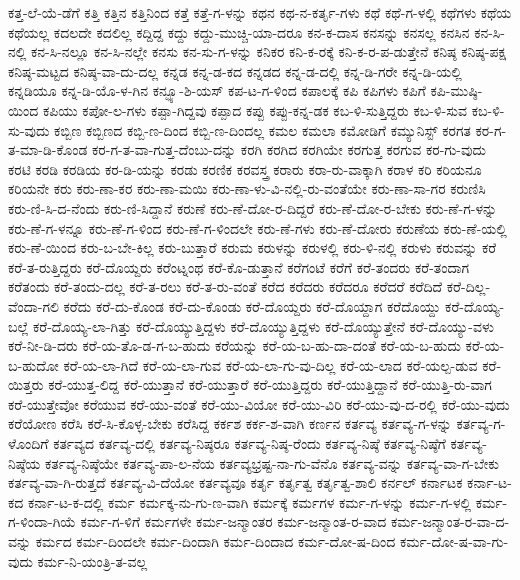 {ಕತ್ತ-ಲೆ-ಯೆ-ಡೆಗೆ
ಕತ್ತಿ
ಕತ್ತಿನ
ಕತ್ತಿನಿಂದ
ಕತ್ತೆ
ಕತ್ತೆ-ಗ-ಳನ್ನು
ಕಥನ
ಕಥ-ನ-ಕರ್ತೃ-ಗಳು
ಕಥೆ
ಕಥೆ-ಗ-ಳಲ್ಲಿ
ಕಥೆಗಳು
ಕಥೆಯ
ಕಥೆಯಲ್ಲ
ಕದಲದೇ
ಕದಲಿಲ್ಲ
ಕದ್ದಿದ್ದ
ಕದ್ದು
ಕದ್ದು-ಮುಚ್ಚಿ-ಯಾ-ದರೂ
ಕನ-ಕ-ದಾಸ
ಕನಸನ್ನು
ಕನಸಲ್ಲ
ಕನಸಿನ
ಕನ-ಸಿ-ನಲ್ಲಿ
ಕನ-ಸಿ-ನಲ್ಲೂ
ಕನ-ಸಿ-ನಲ್ಲೇ
ಕನಸು
ಕನ-ಸು-ಗ-ಳನ್ನು
ಕನಿಕರ
ಕನಿ-ಕ-ರಕ್ಕೆ
ಕನಿ-ಕ-ರ-ಪ-ಡುತ್ತೇನೆ
ಕನಿಷ್ಠ
ಕನಿಷ್ಠ-ಪಕ್ಷ
ಕನಿಷ್ಠ-ಮಟ್ಟದ
ಕನಿಷ್ಠ-ವಾ-ದು-ದಲ್ಲ
ಕನ್ನಡ
ಕನ್ನ-ಡ-ಕದ
ಕನ್ನಡದ
ಕನ್ನ-ಡ-ದಲ್ಲಿ
ಕನ್ನ-ಡಿ-ಗರೇ
ಕನ್ನ-ಡಿ-ಯಲ್ಲಿ
ಕನ್ನಡಿಯೂ
ಕನ್ನ-ಡಿ-ಯೊ-ಳ-ಗಿನ
ಕನ್ಫ್ಯೂ-ಶಿ-ಯಸ್
ಕಪ-ಟ-ಗ-ಳಿಂದ
ಕಪಾಲಕ್ಕೆ
ಕಪಿ
ಕಪಿಗಳು
ಕಪಿಗೆ
ಕಪಿ-ಮುಷ್ಠಿ-ಯಿಂದ
ಕಪಿಯು
ಕಪೋ-ಲ-ಗಳು
ಕಪ್ಪಾ-ಗಿದ್ದವು
ಕಪ್ಪಾದ
ಕಪ್ಪು
ಕಪ್ಪು-ಕನ್ನ-ಡಕ
ಕಬ-ಳಿ-ಸುತ್ತಿದ್ದರು
ಕಬ-ಳಿ-ಸುವ
ಕಬ-ಳಿ-ಸು-ವುದು
ಕಬ್ಬಿಣ
ಕಬ್ಬಿಣದ
ಕಬ್ಬಿ-ಣ-ದಿಂದ
ಕಬ್ಬಿ-ಣ-ದಿಂದಲ್ಲ
ಕಮಲ
ಕಮಲಾ
ಕಮೋಡಿಗೆ
ಕಮ್ಯುನಿಸ್ಟ್
ಕರಗತ
ಕರ-ಗ-ತ-ಮಾ-ಡಿ-ಕೊಂಡ
ಕರ-ಗ-ತ-ವಾ-ಗುತ್ತ-ದೆಂಬು-ದನ್ನು
ಕರಗಿ
ಕರಗಿದ
ಕರಗಿಯೇ
ಕರಗುತ್ತ
ಕರಗುವ
ಕರ-ಗು-ವುದು
ಕರಟಿ
ಕರಡಿ
ಕರಡಿಯ
ಕರ-ಡಿ-ಯನ್ನು
ಕರಡು
ಕರಣಿಕ
ಕರವಸ್ತ್ರ
ಕರಾರು
ಕರಾ-ರು-ವಾಕ್ಕಾಗಿ
ಕರಾಳ
ಕರಿ
ಕರಿಯನೂ
ಕರಿಯನೇ
ಕರು
ಕರು-ಣಾ-ಕರ
ಕರು-ಣಾ-ಮಯಿ
ಕರು-ಣಾ-ಳು-ವಿ-ನಲ್ಲಿ-ರು-ವಂತೆಯೇ
ಕರು-ಣಾ-ಸಾ-ಗರ
ಕರುಣಿಸಿ
ಕರು-ಣಿ-ಸಿ-ದ-ನೆಂದು
ಕರು-ಣಿ-ಸಿದ್ದಾನೆ
ಕರುಣೆ
ಕರು-ಣೆ-ದೋ-ರ-ದಿದ್ದರೆ
ಕರು-ಣೆ-ದೋ-ರ-ಬೇಕು
ಕರು-ಣೆ-ಗ-ಳನ್ನು
ಕರು-ಣೆ-ಗ-ಳನ್ನೂ
ಕರು-ಣೆ-ಗ-ಳಿಂದ
ಕರು-ಣೆ-ಗ-ಳಿಂದಲೇ
ಕರು-ಣೆ-ಗಳು
ಕರು-ಣೆ-ದೋರು
ಕರುಣೆಯ
ಕರು-ಣೆ-ಯಲ್ಲಿ
ಕರು-ಣೆ-ಯಿಂದ
ಕರು-ಬ-ಬೇ-ಕಿಲ್ಲ
ಕರು-ಬುತ್ತಾರೆ
ಕರುಮ
ಕರುಳನ್ನು
ಕರುಳಲ್ಲಿ
ಕರು-ಳಿ-ನಲ್ಲಿ
ಕರುಳು
ಕರುವನ್ನು
ಕರೆ
ಕರೆ-ತ-ರುತ್ತಿದ್ದರು
ಕರೆ-ದೊಯ್ದರು
ಕರೆಂಟ್ನಂಥ
ಕರೆ-ಕೊ-ಡುತ್ತಾನೆ
ಕರೆಗಂಟೆ
ಕರೆಗೆ
ಕರೆ-ತಂದರು
ಕರೆ-ತಂದಾಗ
ಕರೆತಂದು
ಕರೆ-ತಂದು-ದಲ್ಲ
ಕರೆ-ತ-ರಲು
ಕರೆ-ತ-ರು-ವಂತೆ
ಕರೆದ
ಕರೆದರು
ಕರೆದರೂ
ಕರೆದರೆ
ಕರೆದಿದೆ
ಕರೆ-ದಿಲ್ಲ-ವೆಂದಾ-ಗಲಿ
ಕರೆದು
ಕರೆ-ದು-ಕೊಂಡ
ಕರೆ-ದು-ಕೊಂಡು
ಕರೆ-ದೊಯ್ದರು
ಕರೆ-ದೊಯ್ದಾಗ
ಕರೆದೊಯ್ದು
ಕರೆ-ದೊಯ್ಯ-ಬಲ್ಲೆ
ಕರೆ-ದೊಯ್ಯ-ಲಾ-ಗಿತ್ತು
ಕರೆ-ದೊಯ್ಯುತ್ತಿದ್ದಳು
ಕರೆ-ದೊಯ್ಯುತ್ತಿದ್ದಳು
ಕರೆ-ದೊಯ್ಯುತ್ತೇನೆ
ಕರೆ-ದೊಯ್ಯು-ವಳು
ಕರೆ-ನೀ-ಡಿ-ದರು
ಕರೆ-ಯ-ತೊ-ಡ-ಗ-ಬ-ಹುದು
ಕರೆಯನ್ನು
ಕರೆ-ಯ-ಬ-ಹು-ದಾ-ದಂತೆ
ಕರೆ-ಯ-ಬ-ಹುದು
ಕರೆ-ಯ-ಬ-ಹುದೋ
ಕರೆ-ಯ-ಲಾ-ಗಿದೆ
ಕರೆ-ಯ-ಲಾ-ಗುವ
ಕರೆ-ಯ-ಲಾ-ಗು-ವು-ದಿಲ್ಲ
ಕರೆ-ಯ-ಲಾದ
ಕರೆ-ಯಲ್ಪ-ಡುವ
ಕರೆ-ಯಿತ್ತರು
ಕರೆ-ಯುತ್ತ-ಲಿದ್ದ
ಕರೆ-ಯುತ್ತಾನೆ
ಕರೆ-ಯುತ್ತಾರೆ
ಕರೆ-ಯುತ್ತಿದ್ದರು
ಕರೆ-ಯುತ್ತಿದ್ದಾನೆ
ಕರೆ-ಯುತ್ತಿ-ರು-ವಾಗ
ಕರೆ-ಯುತ್ತೇವೋ
ಕರೆಯುವ
ಕರೆ-ಯು-ವಂತೆ
ಕರೆ-ಯು-ವಿಯೋ
ಕರೆ-ಯು-ವಿರಿ
ಕರೆ-ಯು-ವು-ದ-ರಲ್ಲಿ
ಕರೆ-ಯು-ವುದು
ಕರೆಯೋಣ
ಕರೆಸಿ
ಕರೆ-ಸಿ-ಕೊಳ್ಳ-ಬೇಕು
ಕರೆಸಿದ್ದ
ಕರ್ಕಶ
ಕರ್ಕ-ಶ-ವಾಗಿ
ಕರ್ಣನ
ಕರ್ತವ್ಯ
ಕರ್ತವ್ಯ-ಗ-ಳನ್ನು
ಕರ್ತವ್ಯ-ಗ-ಳೊಂದಿಗೆ
ಕರ್ತವ್ಯದ
ಕರ್ತವ್ಯ-ದಲ್ಲಿ
ಕರ್ತವ್ಯ-ನಿಷ್ಠರೂ
ಕರ್ತವ್ಯ-ನಿಷ್ಠ-ರೆಂದು
ಕರ್ತವ್ಯ-ನಿಷ್ಠೆ
ಕರ್ತವ್ಯ-ನಿಷ್ಠೆಗೆ
ಕರ್ತವ್ಯ-ನಿಷ್ಠೆಯ
ಕರ್ತವ್ಯ-ನಿಷ್ಠೆಯೇ
ಕರ್ತವ್ಯ-ಪಾ-ಲ-ನೆಯ
ಕರ್ತವ್ಯಭ್ರಷ್ಟ-ನಾ-ಗು-ವೆನೊ
ಕರ್ತವ್ಯ-ವನ್ನು
ಕರ್ತವ್ಯ-ವಾ-ಗ-ಬೇಕು
ಕರ್ತವ್ಯ-ವಾ-ಗಿ-ರುತ್ತದೆ
ಕರ್ತವ್ಯ-ವಿ-ದೆಯೋ
ಕರ್ತವ್ಯವೂ
ಕರ್ತೃ
ಕರ್ತೃತ್ವ
ಕರ್ತೃತ್ವ-ಶಾಲಿ
ಕರ್ನಲ್
ಕರ್ನಾಟಕ
ಕರ್ನಾ-ಟ-ಕದ
ಕರ್ನಾ-ಟ-ಕ-ದಲ್ಲಿ
ಕರ್ಮ
ಕರ್ಮಕ್ಕ-ನು-ಗು-ಣ-ವಾಗಿ
ಕರ್ಮಕ್ಕೆ
ಕರ್ಮಗಳ
ಕರ್ಮ-ಗ-ಳನ್ನು
ಕರ್ಮ-ಗ-ಳಲ್ಲಿ
ಕರ್ಮ-ಗ-ಳಿಂದಾ-ಗಿಯೆ
ಕರ್ಮ-ಗ-ಳಿಗೆ
ಕರ್ಮಗಳೇ
ಕರ್ಮ-ಜನ್ಮಾಂತರ
ಕರ್ಮ-ಜನ್ಮಾಂತ-ರ-ವಾದ
ಕರ್ಮ-ಜನ್ಮಾಂತ-ರ-ವಾ-ದ-ವನ್ನು
ಕರ್ಮದ
ಕರ್ಮ-ದಿಂದಲೇ
ಕರ್ಮ-ದಿಂದಾಗಿ
ಕರ್ಮ-ದಿಂದಾದ
ಕರ್ಮ-ದೋ-ಷ-ದಿಂದ
ಕರ್ಮ-ದೋ-ಷ-ವಾ-ಗು-ವುದು
ಕರ್ಮ-ನಿ-ಯಂತ್ರಿ-ತ-ವಲ್ಲ
}
